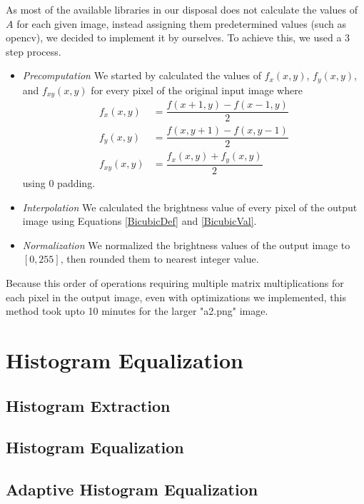 \documentclass[conference]{IEEEtran}
\begin{document}
As most of the available libraries in our disposal does not calculate the values of $A$ for each given image, instead assigning them predetermined values (such as opencv), we decided to implement it by ourselves. To achieve this, we used a 3 step process.
\begin{itemize}
	\item \textit{Precomputation} We started by calculated the values of $f_x(x,y)$, $f_y(x,y)$, and $f_{xy}(x,y)$ for every pixel of the original input image where
	\begin{align}
		f_x(x,y) &= \dfrac{f(x+1,y)-f(x-1,y)}{2}\\
		f_y(x,y) &= \dfrac{f(x,y+1)-f(x,y-1)}{2}\\
		f_{xy}(x,y) &= \dfrac{f_x(x,y)+f_y(x,y)}{2}
	\end{align}
	using $0$ padding.
	\item \textit{Interpolation} We calculated the brightness value of every pixel of the output image using Equations \ref{BicubicDef} and \ref{BicubicVal}.
	\item \textit{Normalization} We normalized the brightness values of the output image to $[0,255]$, then rounded them to nearest integer value.
\end{itemize}

Because this order of operations requiring multiple matrix multiplications for each pixel in the output image, even with optimizations we implemented, this method took upto 10 minutes for the larger "a2.png" image.

\section{Histogram Equalization}


\subsection{Histogram Extraction}


\subsection{Histogram Equalization}



\subsection{Adaptive Histogram Equalization}
\end{document}
